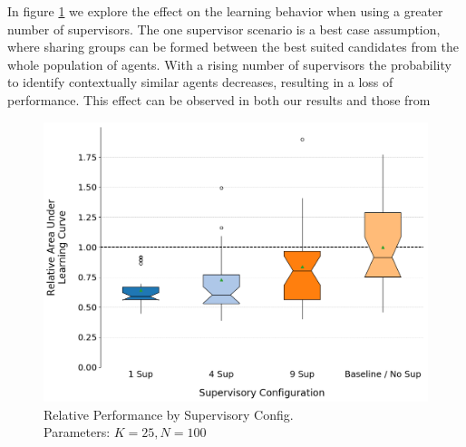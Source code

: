 \documentclass[letterpaper]{article}
\begin{document}
In figure \ref{fig:sups} we explore the effect on the learning behavior when using a greater number of supervisors. The one supervisor scenario is a best case assumption, where sharing groups can be formed between the best suited candidates from the whole population of agents. With a rising number of supervisors the probability to identify contextually similar agents decreases, resulting in a loss of performance. This effect can be observed in both our results and those from \citeauthor{garant2015accelerating}
\begin{figure}[H]
 \begin{center}
  \includegraphics[width=\linewidth]{figures/figure7}
  \caption{Relative Performance by Supervisory Config.\\Parameters: $K=25,N=100$}
  \label{fig:sups}
 \end{center}
\end{figure}
\end{document}
